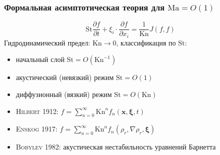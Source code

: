 \documentclass[mathserif]{beamer} %
\newcommand{\Kn}{\mathrm{Kn}}
\newcommand{\St}{\mathrm{St}}
\newcommand{\Ma}{\mathrm{Ma}}
\newcommand{\pder}[2][]{\frac{\partial#1}{\partial#2}}
\newcommand{\bxi}{\boldsymbol{\xi}}
\newcommand{\bx}{\boldsymbol{x}}
\newcommand{\OO}[1]{O(#1)}
\newcommand{\Cite}[2][]{\alert{\textsc{#2 #1}}}
\begin{document}
\begin{frame}
    \frametitle{Формальная асимптотическая теория для \(\Ma = \OO{1}\)}
    \[ \St \pder[f]{t} + \xi_i\cdot\pder[f]{x_i} = \frac1{\Kn} J(f,f) \]
    Гидродинамический предел: \(\Kn\to0\), классификация по \(\St\):
    \begin{itemize}
        \item начальный слой \(\St = \OO{\Kn^{-1}}\)
        \item акустический (невязкий) режим \(\St = \OO{1}\)
        \item диффузионный (вязкий) режим \(\St = \OO{\Kn}\)
    \end{itemize}
    \begin{itemize}
        \item \Cite[1912]{Hilbert}: \( f = \sum_{n=0}^\infty \Kn^n f_n(\bx,\bxi,t) \)
        \item \Cite[1917]{Enskog}: \( f = \sum_{n=0}^\infty \Kn^n f_n(\rho_r,\nabla\rho_r,\bxi) \)
        \item \Cite[1982]{Bobylev}: акустическая нестабильность уравнений Барнетта
    \end{itemize}
\end{frame}
\end{document}
